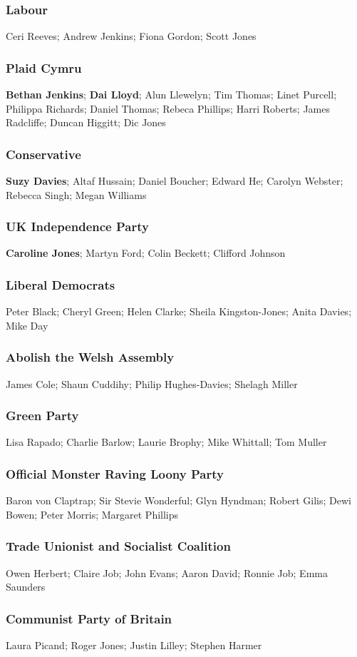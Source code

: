 \begin{resultsiii}
\subsubsection*{Labour}
Ceri Reeves; Andrew Jenkins; Fiona Gordon; Scott Jones
\subsubsection*{Plaid Cymru}
\textbf{Bethan Jenkins}; \textbf{Dai Lloyd}; Alun Llewelyn; Tim Thomas; Linet Purcell; Philippa Richards; Daniel Thomas; Rebeca Phillips; Harri Roberts; James Radcliffe; Duncan Higgitt; Dic Jones
\subsubsection*{Conservative}
\textbf{Suzy Davies}; Altaf Hussain; Daniel Boucher; Edward He; Carolyn Webster; Rebecca Singh; Megan Williams
\subsubsection*{UK Independence Party}
\textbf{Caroline Jones}; Martyn Ford; Colin Beckett; Clifford Johnson
\subsubsection*{Liberal Democrats}
Peter Black; Cheryl Green; Helen Clarke; Sheila Kingston-Jones; Anita Davies; Mike Day
\subsubsection*{Abolish the Welsh Assembly}
James Cole; Shaun Cuddihy; Philip Hughes-Davies; Shelagh Miller
\subsubsection*{Green Party}
Lisa Rapado; Charlie Barlow; Laurie Brophy; Mike Whittall; Tom Muller
\subsubsection*{Official Monster Raving Loony Party}
Baron von Claptrap; Sir Stevie Wonderful; Glyn Hyndman; Robert Gilis; Dewi Bowen; Peter Morris; Margaret Phillips
\subsubsection*{Trade Unionist and Socialist Coalition}
Owen Herbert; Claire Job; John Evans; Aaron David; Ronnie Job; Emma Saunders
\subsubsection*{Communist Party of Britain}
Laura Picand; Roger Jones; Justin Lilley; Stephen Harmer
\end{resultsiii}

